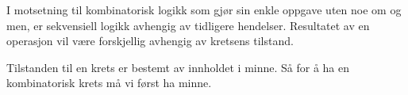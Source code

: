 I motsetning til kombinatorisk logikk som gjør sin enkle oppgave uten noe
om og men, er sekvensiell logikk avhengig av tidligere hendelser.
Resultatet av en operasjon vil være forskjellig avhengig av kretsens tilstand.

Tilstanden til en krets er bestemt av innholdet i minne.
Så for å ha en kombinatorisk krets må vi først ha minne.
